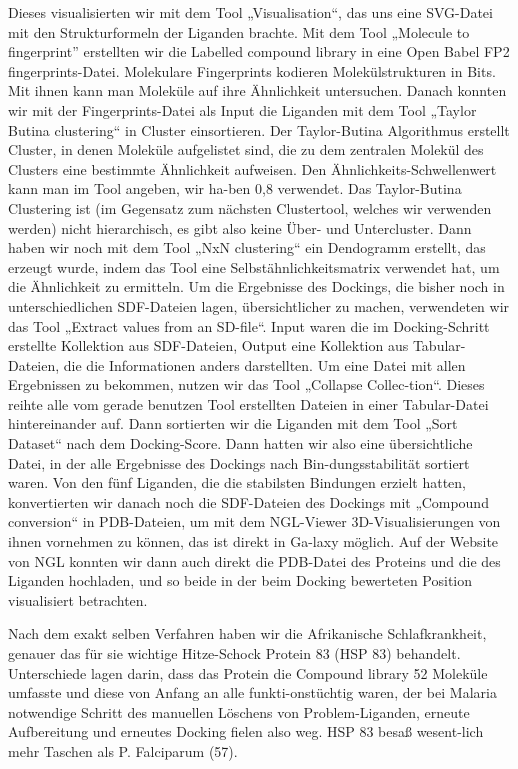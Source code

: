 \documentclass[11pt]{article}
\begin{document}
    Dieses visualisierten wir mit dem Tool „Visualisation“, das uns eine SVG-Datei mit den Strukturformeln der Liganden brachte.
    Mit dem Tool „Molecule to fingerprint” erstellten wir die Labelled compound library in eine Open Babel FP2 fingerprints-Datei. Molekulare Fingerprints kodieren Molekülstrukturen in Bits. Mit ihnen kann man Moleküle auf ihre Ähnlichkeit untersuchen.
    Danach konnten wir mit der Fingerprints-Datei als Input die Liganden mit dem Tool „Taylor Butina clustering“ in Cluster einsortieren. Der Taylor-Butina Algorithmus erstellt Cluster, in denen Moleküle aufgelistet sind, die zu dem zentralen Molekül des Clusters eine bestimmte Ähnlichkeit aufweisen. Den Ähnlichkeits-Schwellenwert kann man im Tool angeben, wir ha-ben 0,8 verwendet. Das Taylor-Butina Clustering ist (im Gegensatz zum nächsten Clustertool, welches wir verwenden werden) nicht hierarchisch, es gibt also keine Über- und Untercluster.
    Dann haben wir noch mit dem Tool „NxN clustering“ ein Dendogramm erstellt, das erzeugt wurde, indem das Tool eine Selbstähnlichkeitsmatrix verwendet hat, um die Ähnlichkeit zu ermitteln.
    Um die Ergebnisse des Dockings, die bisher noch in unterschiedlichen SDF-Dateien lagen, übersichtlicher zu machen, verwendeten wir das Tool „Extract values from an SD-file“. Input waren die im Docking-Schritt erstellte Kollektion aus SDF-Dateien, Output eine Kollektion aus Tabular-Dateien, die die Informationen anders darstellten.
    Um eine Datei mit allen Ergebnissen zu bekommen, nutzen wir das Tool „Collapse Collec-tion“. Dieses reihte alle vom gerade benutzen Tool erstellten Dateien in einer Tabular-Datei hintereinander auf. Dann sortierten wir die Liganden mit dem Tool „Sort Dataset“ nach dem Docking-Score.
    Dann hatten wir also eine übersichtliche Datei, in der alle Ergebnisse des Dockings nach Bin-dungsstabilität sortiert waren.
    Von den fünf Liganden, die die stabilsten Bindungen erzielt hatten, konvertierten wir danach noch die SDF-Dateien des Dockings mit „Compound conversion“ in PDB-Dateien, um mit dem NGL-Viewer 3D-Visualisierungen von ihnen vornehmen zu können, das ist direkt in Ga-laxy möglich.
    Auf der Website von NGL konnten wir dann auch direkt die PDB-Datei des Proteins und die des Liganden hochladen, und so beide in der beim Docking bewerteten Position visualisiert betrachten.

    Nach dem exakt selben Verfahren haben wir die Afrikanische Schlafkrankheit, genauer das für sie wichtige Hitze-Schock Protein 83 (HSP 83) behandelt. Unterschiede lagen darin, dass das Protein die Compound library 52 Moleküle umfasste und diese von Anfang an alle funkti-onstüchtig waren, der bei Malaria notwendige Schritt des manuellen Löschens von Problem-Liganden, erneute Aufbereitung und erneutes Docking fielen also weg. HSP 83 besaß wesent-lich mehr Taschen als P. Falciparum (57).
\end{document}
